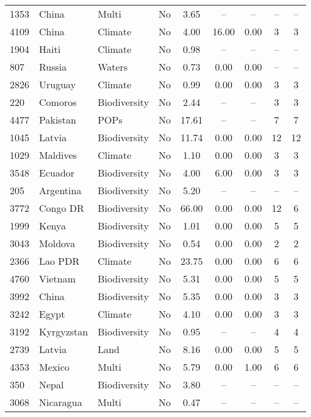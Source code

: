 \documentclass{article}
\begin{document}
\begin{singlespace}
\begin{table}[H]
{\begin{tabular}{lllcccccc}
	1353 & China & Multi & No & 3.65 & -- & -- & -- & -- \\
	\rowcolor[HTML]{EFEFEF} 
	4109 & China & Climate & No & 4.00 & 16.00 & 0.00 & 3 & 3 \\
	1904 & Haiti & Climate & No & 0.98 & -- & -- & -- & -- \\
	\rowcolor[HTML]{EFEFEF} 
	807 & Russia & Waters & No & 0.73 & 0.00 & 0.00 & -- & -- \\
	2826 & Uruguay & Climate & No & 0.99 & 0.00 & 0.00 & 3 & 3 \\
	\rowcolor[HTML]{EFEFEF} 
	220 & Comoros & Biodiversity & No & 2.44 & -- & -- & 3 & 3 \\
	4477 & Pakistan & POPs & No & 17.61 & -- & -- & 7 & 7 \\
	\rowcolor[HTML]{EFEFEF} 
	1045 & Latvia & Biodiversity & No & 11.74 & 0.00 & 0.00 & 12 & 12 \\
	1029 & Maldives & Climate & No & 1.10 & 0.00 & 0.00 & 3 & 3 \\
	\rowcolor[HTML]{EFEFEF} 
	3548 & Ecuador & Biodiversity & No & 4.00 & 6.00 & 0.00 & 3 & 3 \\
	205 & Argentina & Biodiversity & No & 5.20 & -- & -- & -- & -- \\
	\rowcolor[HTML]{EFEFEF} 
	3772 & Congo DR & Biodiversity & No & 66.00 & 0.00 & 0.00 & 12 & 6 \\
	1999 & Kenya & Biodiversity & No & 1.01 & 0.00 & 0.00 & 5 & 5 \\
	\rowcolor[HTML]{EFEFEF} 
	3043 & Moldova & Biodiversity & No & 0.54 & 0.00 & 0.00 & 2 & 2 \\
	2366 & Lao PDR & Climate & No & 23.75 & 0.00 & 0.00 & 6 & 6 \\
	\rowcolor[HTML]{EFEFEF} 
	4760 & Vietnam & Biodiversity & No & 5.31 & 0.00 & 0.00 & 5 & 5 \\
	3992 & China & Biodiversity & No & 5.35 & 0.00 & 0.00 & 3 & 3 \\
	\rowcolor[HTML]{EFEFEF} 
	3242 & Egypt & Climate & No & 4.10 & 0.00 & 0.00 & 3 & 3 \\
	3192 & Kyrgyzstan & Biodiversity & No & 0.95 & -- & -- & 4 & 4 \\
	\rowcolor[HTML]{EFEFEF} 
	2739 & Latvia & Land & No & 8.16 & 0.00 & 0.00 & 5 & 5 \\
	4353 & Mexico & Multi & No & 5.79 & 0.00 & 1.00 & 6 & 6 \\
	\rowcolor[HTML]{EFEFEF} 
	350 & Nepal & Biodiversity & No & 3.80 & -- & -- & -- & -- \\
	3068 & Nicaragua & Multi & No & 0.47 & -- & -- & -- & -- \\

\end{tabular}}
\end{table}
\end{singlespace}
\end{document}
